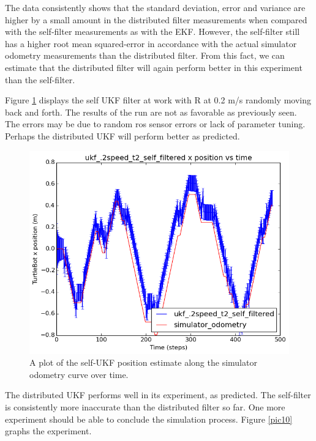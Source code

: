 \documentclass[conference]{IEEEtran} \usepackage[T1]{fontenc} \usepackage[backend=biber, style=ieee]{biblatex}
\begin{document}

The data consistently shows that the standard deviation, error and variance are higher by a small amount in 
the distributed filter measurements when compared with the self-filter measurements as with the EKF. However, 
the self-filter still has a higher root mean squared-error in accordance with the actual simulator odometry 
measurements than the distributed filter. From this fact, we can estimate that the distributed filter will 
again perform better in this experiment than the self-filter.

Figure \ref{pic9} displays the self UKF filter at work with R at 0.2 m/s randomly moving back 
and forth. The results of the run are not as favorable as previously seen. The 
errors may be due to random ros sensor errors or lack of parameter tuning. Perhaps 
the distributed UKF will perform better as predicted.

\begin{figure}
\centering 
\includegraphics[scale=.45]{ukf_2speed_t2_self_filtered_pos_err_graph}
\caption {A plot of the self-UKF position estimate along the simulator odometry curve over time.}
\label{pic9} 
\end{figure}

The distributed UKF performs well in its experiment, as predicted. The self-filter 
is consistently more inaccurate than the distributed filter so far. One more 
experiment should be able to conclude the simulation process. Figure \ref{pic10} graphs the 
experiment. 
\end{document}
